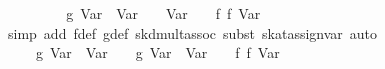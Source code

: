 \begin{isabellebody}
\ \ \isamarkupfalse%
\ \isamarkupfalse%
\ {}{}{}{}\ {}\ {}\ {}{}\ g\ {}Var\ {}{}\ {}Var\ {}{}{}\ {}\ {}{}\ Var\ {}{}\ {}\ {}{}\ f\ {}f\ {}Var\ {}{}{}{}\isanewline
\ \ \ \ \isamarkupfalse%
\ {}simp\ add{}\ f{}def\ g{}def\ skd{}mult{}assoc{}\ subst\ skat{}assign{}{}var{}\ auto{}\isanewline
\ \ \isamarkupfalse%
\ \isamarkupfalse%
\ {}{}{}{}\ {}\ {}\ {}{}\ g\ {}Var\ {}{}\ {}Var\ {}{}{}\ {}\ {}{}\ g\ {}Var\ {}{}\ {}Var\ {}{}{}\ {}\ {}{}\ f\ {}f\ {}Var\ {}{}{}{}\isanewline

\end{isabellebody}
